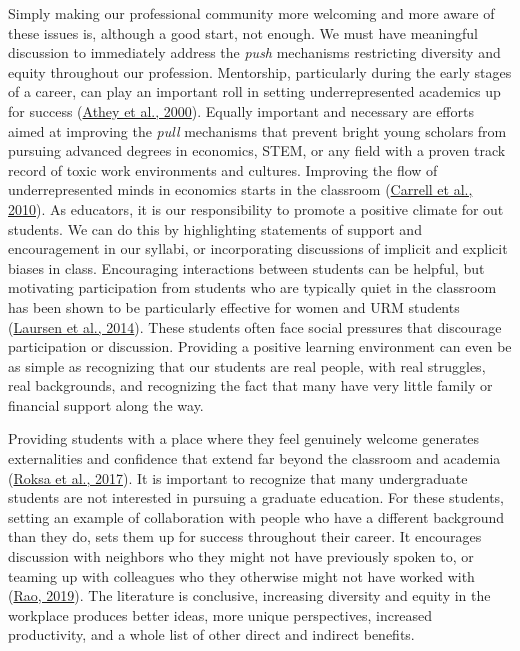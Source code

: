 \documentclass[12pt]{article}
\begin{document}
Simply making our professional community more welcoming and more aware of these issues is, although a good start, not enough. We must have meaningful discussion to immediately address the \textit{push} mechanisms restricting diversity and equity throughout our profession. Mentorship, particularly during the early stages of a career, can play an important roll in setting underrepresented academics up for success (\href{https://www.aeaweb.org/articles?id=10.1257/aer.90.4.765}{Athey et al., 2000}). Equally important and necessary are efforts aimed at improving the \textit{pull} mechanisms that prevent bright young scholars from pursuing advanced degrees in economics, STEM, or any field with a proven track record of toxic work environments and cultures. Improving the flow of underrepresented minds in economics starts in the classroom (\href{https://academic.oup.com/qje/article/125/3/1101/1903648?searchresult=1}{Carrell et al., 2010}). As educators, it is our responsibility to promote a positive climate for out students. We can do this by highlighting statements of support and encouragement in our syllabi, or incorporating discussions of implicit and explicit biases in class. Encouraging interactions between students can be helpful, but motivating participation from students who are typically quiet in the classroom has been shown to be particularly effective for women and URM students (\href{https://www.jstor.org/stable/10.5951/jresematheduc.45.4.0406#metadata_info_tab_contents}{Laursen et al., 2014}). These students often face social pressures that discourage participation or discussion. Providing a positive learning environment can even be as simple as recognizing that our students are real people, with real struggles, real backgrounds, and recognizing the fact that many have very little family or financial support along the way.

Providing students with a place where they feel genuinely welcome generates externalities and confidence that extend far beyond the classroom and academia (\href{https://link.springer.com/article/10.1007/s11162-016-9423-1}{Roksa et al., 2017}). It is important to recognize that many undergraduate students are not interested in pursuing a graduate education. For these students, setting an example of collaboration with people who have a different background than they do, sets them up for success throughout their career. It encourages discussion with neighbors who they might not have previously spoken to, or teaming up with colleagues who they otherwise might not have worked with (\href{https://www.aeaweb.org/articles?id=10.1257/aer.20180044}{Rao, 2019}). The literature is conclusive, increasing diversity and equity in the workplace produces better ideas, more unique perspectives, increased productivity, and a whole list of other direct and indirect benefits. 
\end{document}
